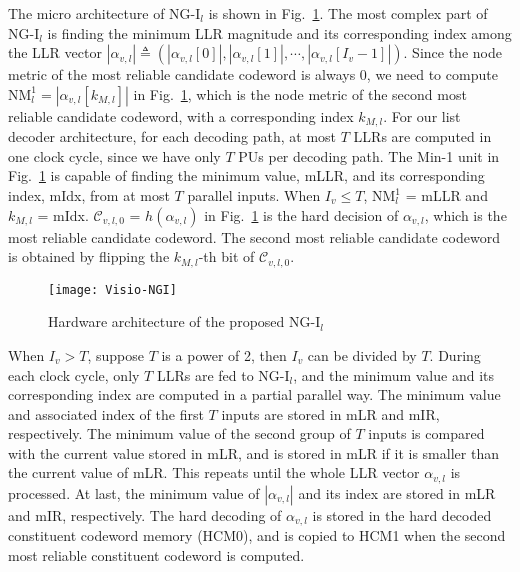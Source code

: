 \documentclass[journal]{IEEEtran}
\begin{document}
The micro architecture of NG-I$_l$ is shown in Fig.~\ref{fig: ngi}. The most complex part of NG-I$_l$ is finding the minimum LLR magnitude and its corresponding index among the LLR vector $|\alpha_{v,l}| \triangleq (|\alpha_{v,l}[0]|, |\alpha_{v,l}[1]|, \cdots, |\alpha_{v,l}[I_v-1]|)$. Since the node metric of the most reliable candidate codeword is always 0, we need to compute $\mbox{NM}_l^1=|\alpha_{v,l}[k_{M,l}]|$ in Fig.~\ref{fig: ngi}, which is the node metric of the second most reliable candidate codeword, with a corresponding index $k_{M,l}$. For our list decoder architecture, for each decoding path, at most $T$ LLRs are computed in one clock cycle, since we have only $T$ PUs per decoding path. The Min-1 unit in Fig.~\ref{fig: ngi} is capable of finding the minimum value, mLLR, and its corresponding index, mIdx, from at most $T$ parallel inputs. When $I_v \leqslant T$, $\mbox{NM}_l^1$ = mLLR and $k_{M,l}$ = mIdx. $\mathcal{C}_{v,l,0}$ = $h(\alpha_{v,l})$ in Fig.~\ref{fig: ngi} is the hard decision of $\alpha_{v,l}$, which is the most reliable candidate codeword. The second most reliable candidate codeword is obtained by flipping the $k_{M,l}$-th bit of $\mathcal{C}_{v,l,0}$.

\begin{figure} [hbt]
  \centering
  \texttt{[image: Visio-NGI]}
  \caption{Hardware architecture of the proposed NG-I$_l$}\label{fig: ngi}
\end{figure}

When $I_v > T$, suppose $T$ is a power of 2, then $I_v$ can be divided by $T$. During each clock cycle, only $T$ LLRs are fed to NG-I$_l$, and the minimum value and its corresponding index are computed in a partial parallel way. The minimum value and associated index of the first $T$ inputs are stored in mLR and mIR, respectively. The minimum value of the second group of $T$ inputs is compared with the current value stored in mLR, and is stored in mLR if it is smaller than the current value of mLR. This repeats until the whole LLR vector $\alpha_{v,l}$ is processed. At last, the minimum value of $|\alpha_{v,l}|$ and its index are stored in mLR and mIR, respectively. The hard decoding of $\alpha_{v,l}$ is stored in the hard decoded constituent codeword memory (HCM0), and is copied to HCM1 when the second most reliable constituent codeword is computed.
\end{document}
